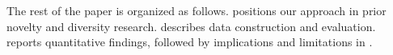The rest of the paper is organized as follows.  positions our approach in prior novelty and diversity research.  describes data construction and evaluation.  reports quantitative findings, followed by implications and limitations in .
